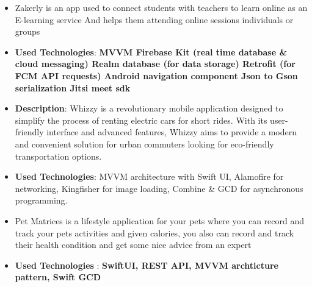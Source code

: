 \documentclass[10pt,a4paper,ragged2e,withhyper]{altacv}
\begin{document}
\begin{itemize}
\item \textbf{}Zakerly is an app used to connect students with teachers to learn online as an E-learning service And helps them attending online sessions individuals or groups
\item \textbf{Used Technologies}: \textbf{MVVM Firebase Kit (real time database \& cloud messaging) Realm database (for data storage) Retrofit (for FCM API requests) Android navigation component Json to Gson serialization Jitsi meet sdk}
\end{itemize}
\divider


\vspace{6px}
\vspace{2px}


\hypertarget{whizzy}{}
\begin{itemize}
\item \textbf{Description}: Whizzy is a revolutionary mobile application designed to simplify the process of renting electric cars for short rides. With its user-friendly interface and advanced features, Whizzy aims to provide a modern and convenient solution for urban commuters looking for eco-friendly transportation options.
\item \textbf{Used Technologies}: MVVM architecture with Swift UI, Alamofire for networking, Kingfisher for image loading, Combine & GCD for asynchronous programming.
\end{itemize}
\divider



\hypertarget{pet_materices}{}
\begin{itemize}
\item \textbf{}Pet Matrices is a lifestyle application for your pets where you can record and track your pets activities and given calories, you also can record and track their health condition and get some nice advice from an expert
\item \textbf{Used Technologies} : \textbf{SwiftUI, REST API, MVVM archticture pattern, Swift GCD}
\end{itemize}
\divider
\end{document}
